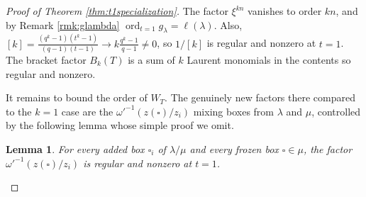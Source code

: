 \documentclass{amsart}
\numberwithin{equation}{section}
\newtheorem{lemma}{Lemma}[section]
\theoremstyle{definition}
\begin{document}
\begin{proof}[Proof of Theorem \ref{thm:t1specialization}]
The factor $\xi^{kn}$ vanishes to order $kn$, and by Remark \ref{rmk:glambda} $\operatorname{ord}_{t=1}g_\lambda=\ell(\lambda)$. Also, $[k]=\frac{(q^k-1)(t^k-1)}{(q-1)(t-1)}\to k\frac{q^k-1}{q-1}\ne0$, so $1/[k]$ is regular and nonzero at $t=1$. The bracket factor $B_k(T)$ is a sum of $k$ Laurent monomials in the contents so regular and nonzero.

It remains to bound the order of $W_T$. %
The genuinely new factors there compared to the $k=1$ case are the $\omega'^{-1}(z(\square)/z_i)$ mixing boxes from $\lambda$ and $\mu$, controlled by the following lemma whose simple proof we omit.
\begin{lemma}\label{lem:frozenreg}
For every added box $\square_i$ of $\lambda/\mu$ and every frozen box $\square\in\mu$, the factor $\omega'^{-1}(z(\square)/z_i)$ is regular and nonzero at $t=1$.
\end{lemma}


\end{proof}
\end{document}
